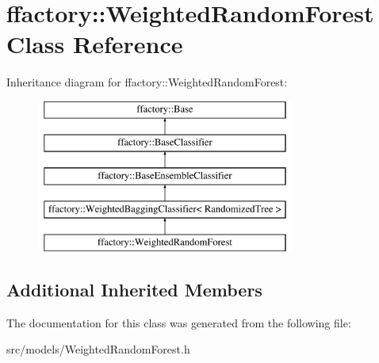 \hypertarget{classffactory_1_1_weighted_random_forest}{\section{ffactory\-:\-:Weighted\-Random\-Forest Class Reference}
\label{classffactory_1_1_weighted_random_forest}
}
Inheritance diagram for ffactory\-:\-:Weighted\-Random\-Forest\-:\begin{figure}[H]
\begin{center}
\leavevmode
\includegraphics[height=5.000000cm]{classffactory_1_1_weighted_random_forest}
\end{center}
\end{figure}
\subsection*{Additional Inherited Members}


The documentation for this class was generated from the following file\-:\begin{DoxyCompactItemize}
\item 
src/models/Weighted\-Random\-Forest.\-h\end{DoxyCompactItemize}
